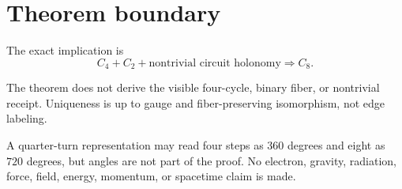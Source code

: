 \section{Theorem boundary}

The exact implication is
\[
C_4+C_2+\text{nontrivial circuit holonomy}
\Longrightarrow C_8.
\]

The theorem does not derive the visible four-cycle, binary fiber, or
nontrivial receipt. Uniqueness is up to gauge and fiber-preserving
isomorphism, not edge labeling.

A quarter-turn representation may read four steps as \(360\) degrees
and eight as \(720\) degrees, but angles are not part of the proof.
No electron, gravity, radiation, force, field, energy, momentum, or
spacetime claim is made.
